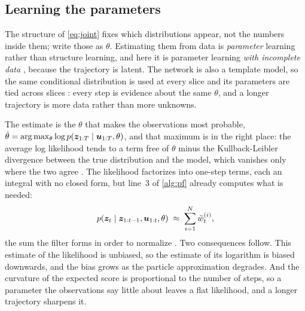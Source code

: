 \subsection{Learning the parameters}\label{sec:learning}

The structure of \eqref{eq:joint} fixes which distributions appear, not the numbers inside them; write those as
$\theta$. Estimating them from data is \emph{parameter} learning rather than structure learning, and here it is
parameter learning \emph{with incomplete data} \cite[ch.~19]{koller2009probabilistic}, because the trajectory is
latent. The network is also a template model, so the same conditional distribution is used at every slice and its
parameters are tied across slices \cite[ch.~6]{koller2009probabilistic}: every step is evidence about the same
$\theta$, and a longer trajectory is more data rather than more unknowns.

The estimate is the $\theta$ that makes the observations most probable, $\hat{\theta} = \arg\max_\theta \log
p(\bm{z}_{1:T} \mid \bm{u}_{1:T}, \theta)$, and that maximum is in the right place: the average log likelihood tends to
a term free of $\theta$ minus the Kullback-Leibler divergence between the true distribution and the model, which
vanishes only where the two agree \cite[ch.~17]{koller2009probabilistic}. The likelihood factorizes into one-step
terms, each an integral with no closed form, but line~3 of \cref{alg:pf} already computes what is needed:
\begin{equation}
  p(\bm{z}_t \mid \bm{z}_{1:t-1}, \bm{u}_{1:t}, \theta) \;\approx\; \sum_{i=1}^{N} \tilde{w}_t^{(i)},
  \label{eq:evidence}
\end{equation}
the sum the filter forms in order to normalize \cite{doucet2011tutorial}. Two consequences follow. This estimate
of the likelihood is unbiased, so the estimate of its logarithm is biased downwards, and the bias grows as the
particle approximation degrades. And the curvature of the expected score is proportional to the number of steps,
so a parameter the observations say little about leaves a flat likelihood, and a longer trajectory sharpens it.

